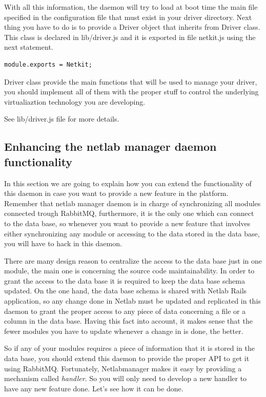 \documentclass{article}
\begin{document}
\begin{figure}[h]
\end{figure}

With all this information, the daemon will try to load at boot time the main file specified in the configuration file that must exist in your driver directory. Next thing you have to do is to provide a Driver object that inherits from Driver class. This class is declared in lib/driver.js and it is exported in file netkit.js using the next statement.

\begin{verbatim}
module.exports = Netkit;
\end{verbatim}

Driver class provide the main functions that will be used to manage your driver, you should implement all of them with the proper stuff to control the underlying virtualiaztion technology you are developing.

See lib/driver.js file for more details.

\subsection{Enhancing the netlab manager daemon functionality}
In this section we are going to explain how you can extend the functionality of this daemon in case you want to provide a new feature in the platform. Remember that netlab manager daemon is in charge of synchronizing all modules connected trough RabbitMQ, furthermore, it is the only one which can connect to the data base, so whenever you want to provide a new feature that involves either synchronizing any module or accessing to the data stored in the data base, you will have to hack in this daemon.

There are many design reason to centralize the access to the data base just in one module, the main one is concerning the source code maintainability. In order to grant the access to the data base it is required to keep the data base schema updated. On the one hand, the data base schema is shared with Netlab Rails application, so any change done in Netlab must be updated and replicated in this daemon to grant the proper access to any piece of data concerning a file or a column in the data base. Having this fact into account, it makes sense that the fewer modules you have to update whenever a change in is done, the better.

So if any of your modules requires a piece of information that it is stored in the data base, you should extend this daemon to provide the proper API to get it using RabbitMQ. Fortunately, Netlabmanager makes it easy by providing a mechanism called \textit{handler}. So you will only need to develop a new handler to have any new feature done. Let's see how it can be done.
\end{document}
